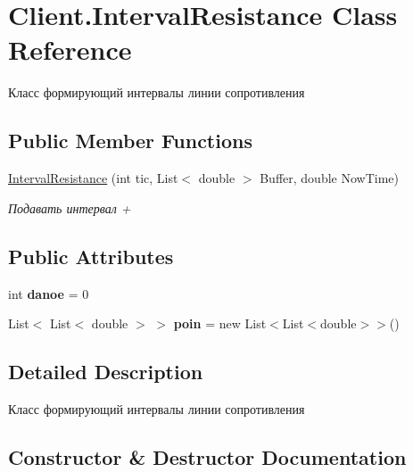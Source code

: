 \hypertarget{class_client_1_1_interval_resistance}{}\section{Client.\+Interval\+Resistance Class Reference}
\label{class_client_1_1_interval_resistance}


Класс формирующий интервалы линии сопротивления  


\subsection*{Public Member Functions}
\begin{DoxyCompactItemize}
\item 
\hyperlink{class_client_1_1_interval_resistance_a106fc4512710179f67ae06bb59dd1082}{Interval\+Resistance} (int tic, List$<$ double $>$ Buffer, double Now\+Time)
\begin{DoxyCompactList}\small\item\em Подавать интервал + \end{DoxyCompactList}\end{DoxyCompactItemize}
\subsection*{Public Attributes}
\begin{DoxyCompactItemize}
\item 
\hypertarget{class_client_1_1_interval_resistance_a951beb2736070f6f01825b07f2c56b60}{}\label{class_client_1_1_interval_resistance_a951beb2736070f6f01825b07f2c56b60} 
int {\bfseries danoe} = 0
\item 
\hypertarget{class_client_1_1_interval_resistance_aa5785984b2dafd978672ac294d5e3add}{}\label{class_client_1_1_interval_resistance_aa5785984b2dafd978672ac294d5e3add} 
List$<$ List$<$ double $>$ $>$ {\bfseries poin} = new List$<$List$<$double$>$$>$()
\end{DoxyCompactItemize}


\subsection{Detailed Description}
Класс формирующий интервалы линии сопротивления 



\subsection{Constructor \& Destructor Documentation}
\hypertarget{class_client_1_1_interval_resistance_a106fc4512710179f67ae06bb59dd1082}{}\label{class_client_1_1_interval_resistance_a106fc4512710179f67ae06bb59dd1082} 
